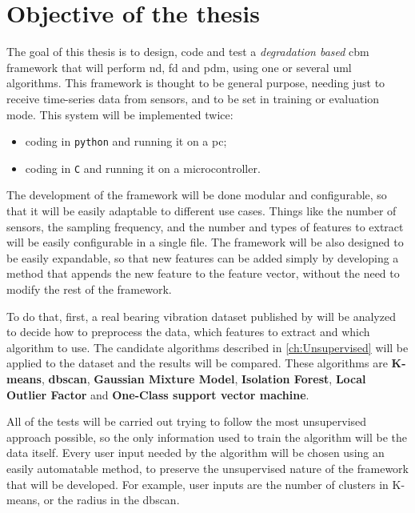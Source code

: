 \section{Objective of the thesis}
\label{sec:objectives}

The goal of this thesis is to design, code and test a \emph{degradation based} \gls{cbm} framework that will perform \gls{nd}, \gls{fd} and \gls{pdm}, using one or several \gls{uml} algorithms. This framework is thought to be general purpose, needing just to receive time-series data from sensors, and to be set in training or evaluation mode.
This system will be implemented twice:
\begin{itemize}
    \item  coding in \texttt{python} and running it on a \gls{pc};
    \item   coding in \texttt{C} and running it on a microcontroller.
\end{itemize}

The development of the framework will be done modular and configurable, so that it will be easily adaptable to different use cases. Things like the number of sensors, the sampling frequency, and the number and types of features to extract will be easily configurable in a single file. The framework will be also designed to be easily expandable, so that new features can be added simply by developing a method that appends the new feature to the feature vector, without the need to modify the rest of the framework.

To do that, first, a real bearing vibration dataset published by \cite{IMSpaper} will be analyzed to decide how to preprocess the data, which features to extract and which algorithm to use. 
The candidate algorithms described in \autoref{ch:Unsupervised} will be applied to the dataset and the results will be compared. These algorithms are \textbf{K-means}, \textbf{\gls{dbscan}}, \textbf{Gaussian Mixture Model}, \textbf{Isolation Forest}, \textbf{Local Outlier Factor} and \textbf{One-Class support vector machine}. 

All of the tests will be carried out trying to follow the most unsupervised approach possible, so the only information used to train the algorithm will be the data itself. Every user input needed by the algorithm will be chosen using an easily automatable method, to preserve the unsupervised nature of the framework that will be developed. For example, user inputs are the number of clusters in K-means, or the radius in the \gls{dbscan}.



